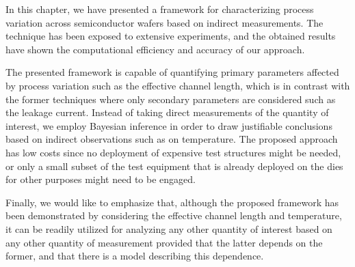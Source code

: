 In this chapter, we have presented a framework for characterizing process
variation across semiconductor wafers based on indirect measurements. The
technique has been exposed to extensive experiments, and the obtained results
have shown the computational efficiency and accuracy of our approach.

The presented framework is capable of quantifying primary parameters affected by
process variation such as the effective channel length, which is in contrast
with the former techniques where only secondary parameters are considered such
as the leakage current. Instead of taking direct measurements of the quantity of
interest, we employ Bayesian inference in order to draw justifiable conclusions
based on indirect observations such as on temperature. The proposed approach has
low costs since no deployment of expensive test structures might be needed, or
only a small subset of the test equipment that is already deployed on the dies
for other purposes might need to be engaged.

Finally, we would like to emphasize that, although the proposed framework has
been demonstrated by considering the effective channel length and temperature,
it can be readily utilized for analyzing any other quantity of interest based on
any other quantity of measurement provided that the latter depends on the
former, and that there is a model describing this dependence.
